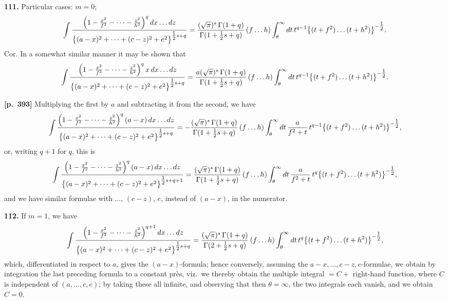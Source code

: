 \documentclass[11pt,a4paper]{article}
\begin{document}
\textbf{111.} Particular cases: $m = 0$;
\[
\int \frac{\Bigl(1 - \tfrac{x^{2}}{f^{2}} - \cdots - \tfrac{z^{2}}{h^{2}}\Bigr)^{q}\,dx\ldots dz}{\bigl\{(a-x)^{2} + \cdots + (c-z)^{2} + e^{2}\bigr\}^{\tfrac{1}{2}s + q}}
= \frac{(\sqrt{\pi})^{s}\,\Gamma(1+q)}{\Gamma(1+\tfrac{1}{2}s + q)}\,(f\ldots h)\int_{\theta}^{\infty} dt\,t^{q-1}\bigl\{(t+f^{2})\ldots(t+h^{2})\bigr\}^{-\tfrac{1}{2}}.
\]
Cor. In a somewhat similar manner it may be shown that
\[
\int \frac{\Bigl(1 - \tfrac{x^{2}}{f^{2}} - \cdots - \tfrac{z^{2}}{h^{2}}\Bigr)^{q}\, x\,dx\ldots dz}{\bigl\{(a-x)^{2} + \cdots + (c-z)^{2} + e^{2}\bigr\}^{\tfrac{1}{2}s + q}}
= \frac{a(\sqrt{\pi})^{s}\,\Gamma(1+q)}{\Gamma(1+\tfrac{1}{2}s + q)}\,(f\ldots h)\int_{\theta}^{\infty} dt\,t^{q-1}\bigl\{(t+f^{2})\ldots(t+h^{2})\bigr\}^{-\tfrac{1}{2}}.
\]

\noindent\textbf{[p.~393]}\quad
Multiplying the first by $a$ and subtracting it from the second, we have
\[
\int \frac{\Bigl(1 - \tfrac{x^{2}}{f^{2}} - \cdots - \tfrac{z^{2}}{h^{2}}\Bigr)^{q}\,(a-x)\,dx\ldots dz}{\bigl\{(a-x)^{2} + \cdots + (c-z)^{2} + e^{2}\bigr\}^{\tfrac{1}{2}s + q}}
= -\frac{(\sqrt{\pi})^{s}\,\Gamma(1+q)}{\Gamma(1+\tfrac{1}{2}s + q)}\,(f\ldots h)\int_{\theta}^{\infty} dt\,\frac{a}{f^{2}+t}\,t^{q-1}\bigl\{(t+f^{2})\ldots(t+h^{2})\bigr\}^{-\tfrac{1}{2}},
\]
or, writing $q+1$ for $q$, this is
\[
\int \frac{\Bigl(1 - \tfrac{x^{2}}{f^{2}} - \cdots - \tfrac{z^{2}}{h^{2}}\Bigr)^{q}\,(a-x)\,dx\ldots dz}{\bigl\{(a-x)^{2} + \cdots + (c-z)^{2} + e^{2}\bigr\}^{\tfrac{1}{2}s + q + 1}}
= \frac{(\sqrt{\pi})^{s}\,\Gamma(1+q)}{\Gamma(1+\tfrac{1}{2}s + q)}\,(f\ldots h)\int_{\theta}^{\infty} dt\,\frac{a}{f^{2}+t}\,t^{q}\bigl\{(t+f^{2})\ldots(t+h^{2})\bigr\}^{-\tfrac{1}{2}},
\]
and we have similar formulae with $\ldots$, $(c - z)$, $e$, instead of $(a - x)$, in the numerator.

\textbf{112.} If $m = 1$, we have
\[
\int \frac{\Bigl(1 - \tfrac{x^{2}}{f^{2}} - \cdots - \tfrac{z^{2}}{h^{2}}\Bigr)^{q+1}\,dx\ldots dz}{\bigl\{(a-x)^{2} + \cdots + (c-z)^{2} + e^{2}\bigr\}^{\tfrac{1}{2}s + q}}
= \frac{(\sqrt{\pi})^{s}\,\Gamma(1+q)}{\Gamma(2+\tfrac{1}{2}s + q)}\,(f\ldots h)\int_{\theta}^{\infty} dt\,t^{q}\bigl\{(t+f^{2})\ldots(t+h^{2})\bigr\}^{-\tfrac{1}{2}},
\]
which, differentiated in respect to $a$, gives the $(a - x)$-formula; hence conversely, assuming the $a - x, \ldots, c - z, e$-formulae, we obtain by integration the last preceding formula to a constant pr\`es, viz.\ we thereby obtain the multiple integral $= C +$ right-hand function, where $C$ is independent of $(a, \ldots, c, e)$; by taking these all infinite, and observing that then $\theta = \infty$, the two integrals each vanish, and we obtain $C = 0$.
\end{document}
